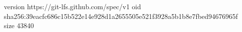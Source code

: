 version https://git-lfs.github.com/spec/v1
oid sha256:39eacfc686c15b522e14e928d1a2655505e521f3928a5b1b8e7fbed94676965f
size 43840
